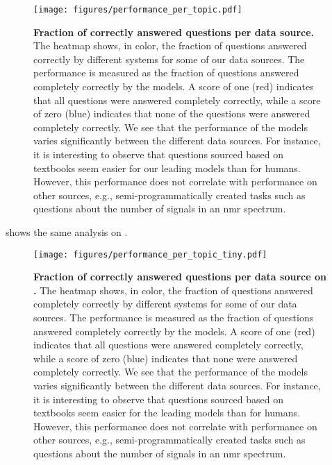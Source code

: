 \begin{figure}[htb]
    \centering
    \texttt{[image: figures/performance\_per\_topic.pdf]}
    \caption{\textbf{Fraction of correctly answered questions per data source.} The heatmap shows, in color, the fraction of questions answered correctly by different systems for some of our data sources. The performance is measured as the fraction of questions answered completely correctly by the models. A score of one (red) indicates that all questions were answered completely correctly, while a score of zero (blue) indicates that none of the questions were answered completely correctly.
        We see that the performance of the models varies significantly between the different data sources. For instance, it is interesting to observe that questions sourced based on textbooks seem easier for our leading models than for humans. However, this performance does not correlate with performance on other sources, e.g., semi-programmatically created tasks such as questions about the number of signals in an \gls{nmr} spectrum.
    }
    \label{fig:performance_per_topic}
\end{figure}

 shows the same analysis on \chembenchmini.


\begin{figure}[htb]
    \centering
    \texttt{[image: figures/performance\_per\_topic\_tiny.pdf]}
    \caption{\textbf{Fraction of  correctly answered questions per data source on \chembenchmini.} The heatmap shows, in color, the fraction of questions answered completely correctly by different systems for some of our data sources. The performance is measured as the fraction of questions answered completely correctly by the models. A score of one (red) indicates that all questions were answered completely correctly, while a score of zero (blue) indicates that none were answered completely correctly.
        We see that the performance of the models varies significantly between the different data sources. For instance, it is interesting to observe that questions sourced based on textbooks seem easier for the leading models than for humans. However, this performance does not correlate with performance on other sources, e.g., semi-programmatically created tasks such as questions about the number of signals in an \gls{nmr} spectrum.
    }
    \label{fig:performance_per_topic_tiny}
\end{figure}



